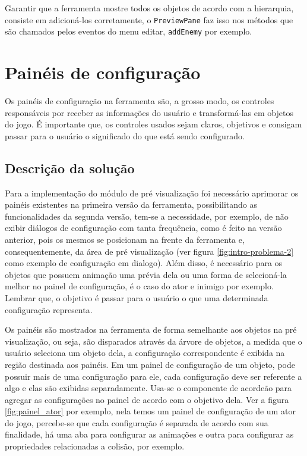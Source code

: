 \documentclass[12pt,oneside,openright,a4paper,english,brazil,sumario=tradicional]{abntex2}
\begin{document}
Garantir que a ferramenta mostre todos os objetos de acordo com a hierarquia, consiste em adicioná-los corretamente, o \texttt{PreviewPane} faz isso nos métodos que são chamados pelos eventos do menu editar, \texttt{addEnemy} por exemplo.

\section{Painéis de configuração}

Os painéis de configuração na ferramenta são, a grosso modo, os controles responsáveis por receber as informações do usuário e transformá-las em objetos do jogo.
É importante que, os controles usados sejam claros, objetivos e consigam passar para o usuário o significado do que está sendo configurado.

\subsection{Descrição da solução}
Para a implementação do módulo de pré visualização foi necessário aprimorar os painéis existentes na primeira versão da ferramenta, possibilitando as funcionalidades da segunda versão, tem-se a necessidade, por exemplo, de não exibir diálogos de configuração  com tanta frequência, como é feito na versão anterior, pois os mesmos se posicionam na frente da ferramenta  e, consequentemente, da área de pré visualização (ver figura \ref{fig:intro-problema-2} como exemplo de configuração em dialogo).
Além disso, é necessário para os objetos que possuem animação uma prévia dela ou uma forma de selecioná-la melhor no painel de configuração, é o caso do ator e inimigo por exemplo.
Lembrar que, o objetivo é passar para o usuário o que uma determinada configuração representa.

Os painéis são mostrados na ferramenta de forma semelhante aos objetos na pré visualização, ou seja, são disparados através da árvore de objetos, a medida que o usuário seleciona um objeto dela, a configuração correspondente é exibida na região destinada aos painéis.
Em um painel de configuração de um objeto, pode possuir mais de uma configuração para ele, cada configuração deve ser referente a algo e elas são exibidas separadamente.
Usa-se o componente de acordeão para agregar as configurações no painel de acordo com o objetivo dela. Ver a figura \ref{fig:painel_ator} por exemplo, nela temos um painel de configuração de um ator do jogo, percebe-se que cada configuração é separada de acordo com sua finalidade, há uma aba para configurar as animações e outra para configurar as propriedades relacionadas a colisão, por exemplo.
\end{document}
